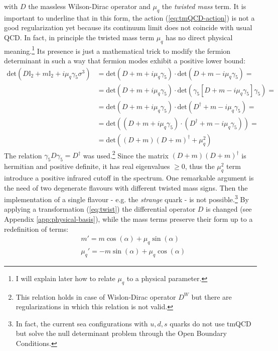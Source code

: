 \documentclass[english, LaM, oneside, noexaminfo]{sapthesis}
\newcommand{\obc}{Open Boundary Conditions}
\begin{document}
with $D$ the massless Wilson-Dirac operator and $\mu_q$ the {\it twisted mass} term.
It is important to underline that in this form, the action (\ref{eq:tmQCD-action}) is not a good regularization yet because its continuum limit does not coincide with usual QCD.
In fact, in principle the twisted mass term $\mu_q$ has no direct physical meaning.\footnote{I will explain later how to relate $\mu_q$ to a physical parameter.}
Its presence is just a mathematical trick to modify the fermion determinant in such a way that fermion modes exhibit a positive lower bound:
\begin{equation*}
    \begin{aligned}
        \text{det}(D \mathbb{I}_2 + m \mathbb{I}_2 + i\mu_q\gamma_5\sigma^3) 
        & = \text{det}(D + m + i\mu_q\gamma_5) \cdot \text{det}(D + m - i\mu_q\gamma_5) = \\
        & = \text{det}(D + m + i\mu_q\gamma_5) \cdot \text{det}(\gamma_5[D + m - i\mu_q\gamma_5]\gamma_5) = \\
        & = \text{det}(D + m + i\mu_q\gamma_5) \cdot \text{det}(D^\dagger + m - i\mu_q\gamma_5) = \\
        & = \text{det}\left((D + m + i\mu_q\gamma_5)\cdot(D^\dagger + m - i\mu_q\gamma_5)\right) = \\
        & = \text{det}\left((D+m)(D+m)^\dagger + \mu_q^2\right)
    \end{aligned}
\end{equation*}
The relation $\gamma_5 D \gamma_5 = D^\dagger$ was used.\footnote{This relation holds in case of Wislon-Dirac operator $D^W$ but there are regularizations in which this relation is not valid.}
Since the matrix $(D+m)(D+m)^\dagger$ is hermitian and positive definite, it has real eigenvalues $\ge 0$, thus the $\mu_q^2$ term introduce a positive infrared cutoff in the spectrum.
One remarkable argument is the need of two degenerate flavours with different twisted mass signs.
Then the implementation of a single flavour - e.g. the {\it strange} quark - is not possible.\footnote{In fact, the current sea configurations with $u,d,s$ quarks do not use tmQCD but solve the null determinant problem through the \obc.}
\newline
By applying a transformation (\ref{eq:twist}) the differential operator $D$ is changed (see Appendix \ref{app:physical-basis}), while the mass terms preserve their form up to a redefinition of terms:
\begin{equation}\label{eq:new-masses}
    \begin{aligned}
        & m' = m \cos (\alpha) + \mu_q \sin (\alpha) \\
        & \mu_q' = - m \sin (\alpha) + \mu_q \cos (\alpha)
    \end{aligned}
\end{equation}
\end{document}
